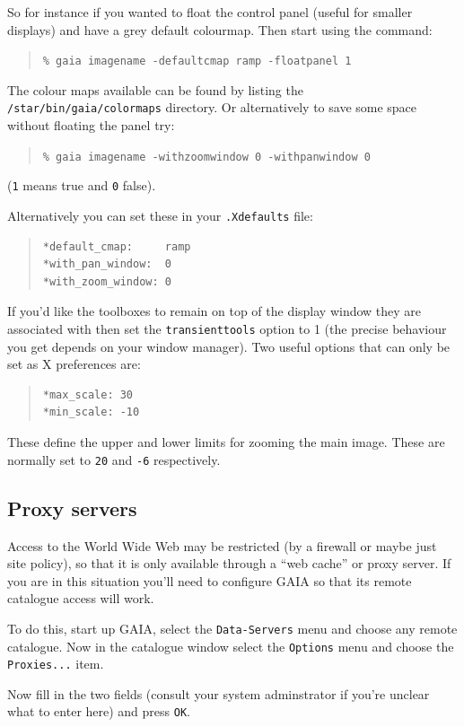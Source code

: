\documentclass[twoside,11pt]{article}
\newcommand{\xlabel}[1]{}
\renewcommand{\_}{\texttt{\symbol{95}}}
\newcommand{\mytt}[1]{{\tt{#1}}}
\begin{document}
So for instance if you wanted to float the control panel (useful for
smaller displays) and have a grey default colourmap. Then start
using the command:
\begin{quote}
\mytt{\% gaia image\_name -default\_cmap ramp -float\_panel 1}
\end{quote}
The colour maps available can be found by listing the
\mytt{/star/bin/gaia/colormaps} directory. Or alternatively to save
some space without floating the panel try:
\begin{quote}
\mytt{\% gaia image\_name -with\_zoom\_window 0 -with\_pan\_window 0}
\end{quote}
(\mytt{1} means true and \mytt{0} false).

Alternatively you can set these in your \mytt{.Xdefaults} file:
\begin{quote}
\begin{verbatim}
*default_cmap:     ramp
*with_pan_window:  0
*with_zoom_window: 0
\end{verbatim}
\end{quote}

If you'd like the toolboxes to remain on top of the display window
they are associated with then set the \mytt{transient\_tools} option
to 1 (the precise behaviour you get depends on your window
manager). Two useful options that can only be set as X preferences
are:
\begin{quote}
\begin{verbatim}
*max_scale: 30
*min_scale: -10
\end{verbatim}
\end{quote}
These define the upper and lower limits for zooming the main
image. These are normally set to \mytt{20} and \mytt{-6}
respectively.

\subsection{\xlabel{proxy_servers}Proxy servers}
Access to the World Wide Web may be restricted (by a firewall or maybe
just site policy), so that it is only available through a ``web
cache'' or proxy server. If you are in this situation you'll need to
configure GAIA so that its remote catalogue access will work.

To do this, start up GAIA, select the \mytt{Data-Servers} menu and
choose any remote catalogue. Now in the catalogue window select the
\mytt{Options} menu and choose the \mytt{Proxies...} item.

Now fill in the two fields (consult your system adminstrator if you're
unclear what to enter here) and press \mytt{OK}.
\end{document}
